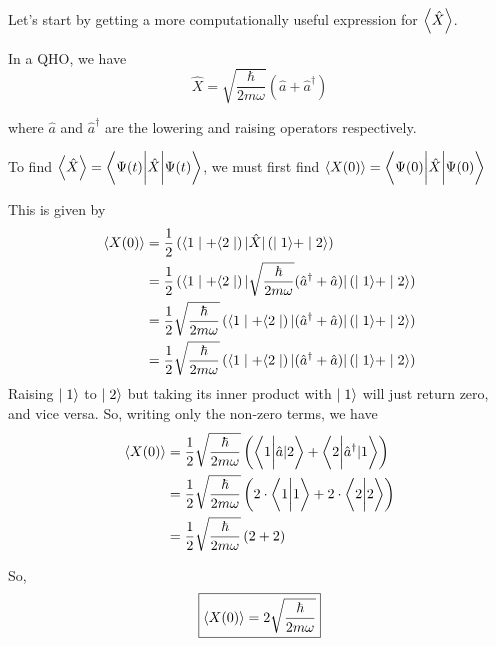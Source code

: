 \documentclass[twoside]{article}
\begin{document}
\begin{enumerate}
   Let's start by getting a more computationally useful expression for $\left\langle \hat{X} \right\rangle$.

   In a QHO, we have 
   \[ \hat{X} = \sqrt{\frac{\hbar}{2m\omega}}(\hat{a} + \hat{a}^{\dagger}) \]
   
   where $\hat{a}$ and $\hat{a}^{\dagger}$ are the lowering and raising operators respectively.

   To find $\left\langle \hat{X} \right\rangle = \left\langle \Psi(t) \bigg\rvert \hat{X}\biggr\rvert\Psi(t) \right\rangle$, we must first find $\left\langle X(0) \right\rangle = \left\langle \Psi(0) \bigg\rvert \hat{X}\biggr\rvert\Psi(0) \right\rangle$

   This is given by 
   \begin{align*}
      \left\langle X(0) \right\rangle &= \frac{1}{2} \left( \langle1\mid + \langle2\mid \right) | \hat{X} | \left( \mid1\rangle + \mid2\rangle \right) \\
      &= \frac{1}{2} \left( \langle1\mid + \langle2\mid \right)|\sqrt{\frac{\hbar}{2m\omega}} (\hat{a}^{\dagger} + \hat{a}) | \left( \mid1\rangle + \mid2\rangle \right) \\
      &= \frac{1}{2} \sqrt{\frac{\hbar}{2m\omega}} \left( \langle1\mid + \langle2\mid \right)| (\hat{a}^{\dagger} + \hat{a}) | \left( \mid1\rangle + \mid2\rangle \right) \\
      &= \frac{1}{2} \sqrt{\frac{\hbar}{2m\omega}} \left( \langle1\mid + \langle2\mid \right)| (\hat{a}^{\dagger} + \hat{a}) | \left( \mid1\rangle + \mid2\rangle \right) 
   \end{align*}
   Raising $\mid1\rangle$ to $\mid2\rangle$ but taking its inner product with $\mid1\rangle$ will just return zero, and vice versa. So, writing only the non-zero terms, we have
   \begin{align*}
      \left\langle X(0) \right\rangle &= \frac{1}{2} \sqrt{\frac{\hbar}{2m\omega}} \left( \left\langle 1 \bigg\rvert \hat{a}|2 \right\rangle + \left\langle 2 \bigg\rvert \hat{a}^{\dagger}|1 \right\rangle \right) \\
      &= \frac{1}{2} \sqrt{\frac{\hbar}{2m\omega}} \left( 2 
      \cdot \left\langle 1 \bigg\rvert 1 \right\rangle + 2 \cdot \left\langle 2 \bigg\rvert 2 \right\rangle \right) \\
      &= \frac{1}{2} \sqrt{\frac{\hbar}{2m\omega}} \left( 2 + 2 \right)
   \end{align*}

   So, 
   \[ \boxed{\left\langle X(0) \right\rangle = 2\sqrt{\frac{\hbar}{2m\omega}}} \]



\end{enumerate}
\end{document}
